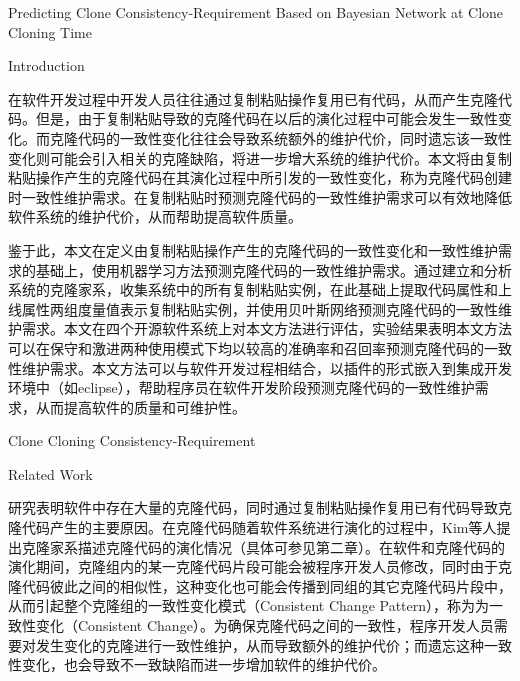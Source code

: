 
{Predicting Clone Consistency-Requirement Based on Bayesian Network at Clone Cloning Time}

{Introduction}

在软件开发过程中开发人员往往通过复制粘贴操作复用已有代码，从而产生克隆代码。但是，由于复制粘贴导致的克隆代码在以后的演化过程中可能会发生一致性变化。而克隆代码的一致性变化往往会导致系统额外的维护代价，同时遗忘该一致性变化则可能会引入相关的克隆缺陷，将进一步增大系统的维护代价。本文将由复制粘贴操作产生的克隆代码在其演化过程中所引发的一致性变化，称为克隆代码创建时一致性维护需求。在复制粘贴时预测克隆代码的一致性维护需求可以有效地降低软件系统的维护代价，从而帮助提高软件质量。

鉴于此，本文在定义由复制粘贴操作产生的克隆代码的一致性变化和一致性维护需求的基础上，使用机器学习方法预测克隆代码的一致性维护需求。通过建立和分析系统的克隆家系，收集系统中的所有复制粘贴实例，在此基础上提取代码属性和上线属性两组度量值表示复制粘贴实例，并使用贝叶斯网络预测克隆代码的一致性维护需求。本文在四个开源软件系统上对本文方法进行评估，实验结果表明本文方法可以在保守和激进两种使用模式下均以较高的准确率和召回率预测克隆代码的一致性维护需求。本文方法可以与软件开发过程相结合，以插件的形式嵌入到集成开发环境中（如eclipse），帮助程序员在软件开发阶段预测克隆代码的一致性维护需求，从而提高软件的质量和可维护性。

{Clone Cloning Consistency-Requirement}

{Related Work}

研究表明软件中存在大量的克隆代码\cite{}，同时通过复制粘贴操作复用已有代码导致克隆代码产生的主要原因\cite{koschke2007survey}。在克隆代码随着软件系统进行演化的过程中，Kim等人提出克隆家系描述克隆代码的演化情况（具体可参见第二章）\cite{kim2005empirical}。在软件和克隆代码的演化期间，克隆组内的某一克隆代码片段可能会被程序开发人员修改，同时由于克隆代码彼此之间的相似性，这种变化也可能会传播到同组的其它克隆代码片段中，从而引起整个克隆组的一致性变化模式（Consistent Change Pattern），称为为一致性变化（Consistent Change）\cite{saha2011automatic}。为确保克隆代码之间的一致性，程序开发人员需要对发生变化的克隆进行一致性维护，从而导致额外的维护代价；而遗忘这种一致性变化，也会导致不一致缺陷而进一步增加软件的维护代价\cite{aversano2007clones}\cite{bettenburg2009empirical}。

